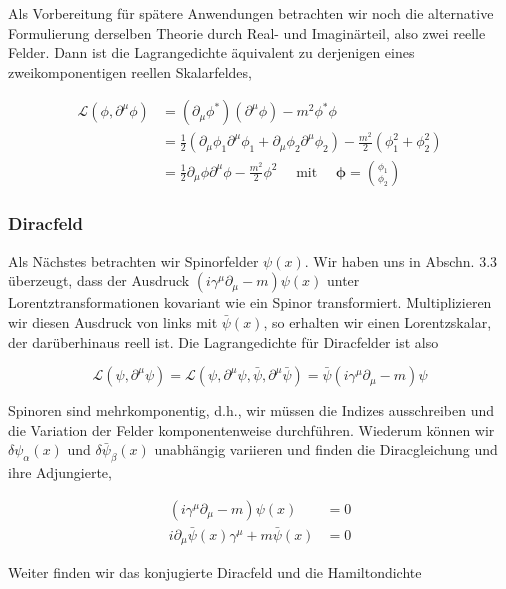 \documentclass[10pt, letterpaper]{article}
\begin{document}
Als Vorbereitung für spätere Anwendungen betrachten wir noch die alternative Formulierung derselben Theorie durch Real- und Imaginärteil, also zwei reelle Felder. Dann ist die Lagrangedichte äquivalent zu derjenigen eines zweikomponentigen reellen Skalarfeldes,

$$
\begin{aligned}
\mathscr{L}\left(\phi, \partial^{\mu} \phi\right) & =\left(\partial_{\mu} \phi^{*}\right)\left(\partial^{\mu} \phi\right)-m^{2} \phi^{*} \phi \\
& =\frac{1}{2}\left(\partial_{\mu} \phi_{1} \partial^{\mu} \phi_{1}+\partial_{\mu} \phi_{2} \partial^{\mu} \phi_{2}\right)-\frac{m^{2}}{2}\left(\phi_{1}^{2}+\phi_{2}^{2}\right) \\
& =\frac{1}{2} \partial_{\mu} \phi \partial^{\mu} \phi-\frac{m^{2}}{2} \phi^{2} \quad \text { mit } \quad \boldsymbol{\phi}=\binom{\phi_{1}}{\phi_{2}}
\end{aligned}
$$

\subsubsection*{Diracfeld}
Als Nächstes betrachten wir Spinorfelder $\psi(x)$. Wir haben uns in Abschn. 3.3 überzeugt, dass der Ausdruck $\left(i \gamma^{\mu} \partial_{\mu}-m\right) \psi(x)$ unter Lorentztransformationen kovariant wie ein Spinor transformiert. Multiplizieren wir diesen Ausdruck von links mit $\bar{\psi}(x)$, so erhalten wir einen Lorentzskalar, der darüberhinaus reell ist. Die Lagrangedichte für Diracfelder ist also

$$
\mathscr{L}\left(\psi, \partial^{\mu} \psi\right)=\mathscr{L}\left(\psi, \partial^{\mu} \psi, \bar{\psi}, \partial^{\mu} \bar{\psi}\right)=\bar{\psi}\left(i \gamma^{\mu} \partial_{\mu}-m\right) \psi
$$

Spinoren sind mehrkomponentig, d.h., wir müssen die Indizes ausschreiben und die Variation der Felder komponentenweise durchführen. Wiederum können wir $\delta \psi_{\alpha}(x)$ und $\delta \bar{\psi}_{\beta}(x)$ unabhängig variieren und finden die Diracgleichung und ihre Adjungierte,

$$
\begin{aligned}
\left(i \gamma^{\mu} \partial_{\mu}-m\right) \psi(x) & =0 \\
i \partial_{\mu} \bar{\psi}(x) \gamma^{\mu}+m \bar{\psi}(x) & =0
\end{aligned}
$$

Weiter finden wir das konjugierte Diracfeld und die Hamiltondichte
\end{document}
